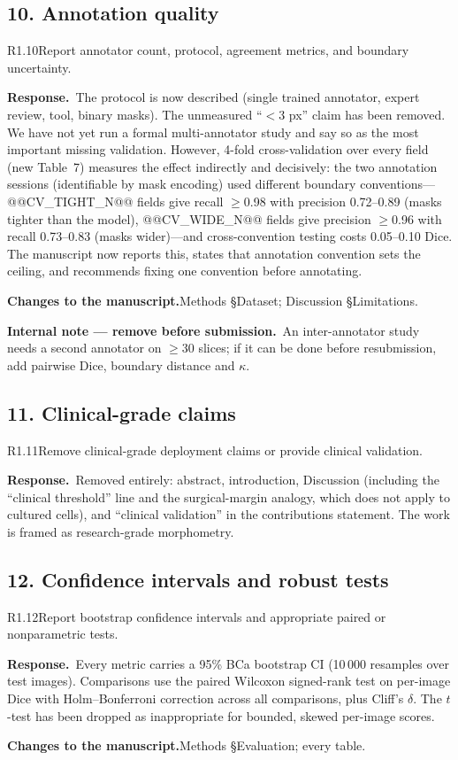 \documentclass[11pt]{article}
\newif\ifinternal \internaltrue
\newcommand{\response}{\par\medskip\noindent\textbf{\color{bblue}Response.}\ }
\newcommand{\actions}{\par\medskip\noindent\textbf{Changes to the manuscript.}}
\newcommand{\internalnote}[1]{\ifinternal\begin{tcolorbox}[breakable,colback=notebg,colframe=notefr,boxrule=0.5pt,arc=2pt]\footnotesize\textbf{Internal note --- remove before submission.}\ #1\end{tcolorbox}\fi}
\begin{document}
\subsection*{10. Annotation quality}
\begin{rcomment}{R1.10}Report annotator count, protocol, agreement metrics, and boundary uncertainty.\end{rcomment}
\response The protocol is now described (single trained annotator, expert review, tool, binary masks). The unmeasured ``$<$3 px'' claim has been removed. We have not yet run a formal multi-annotator study and say so as the most important missing validation. However, 4-fold cross-validation over every field (new Table~7) measures the effect indirectly and decisively: the two annotation sessions (identifiable by mask encoding) used different boundary conventions---@@CV_TIGHT_N@@ fields give recall $\geq$0.98 with precision 0.72--0.89 (masks tighter than the model), @@CV_WIDE_N@@ fields give precision $\geq$0.96 with recall 0.73--0.83 (masks wider)---and cross-convention testing costs 0.05--0.10 Dice. The manuscript now reports this, states that annotation convention sets the ceiling, and recommends fixing one convention before annotating.
\actions Methods §Dataset; Discussion §Limitations. \internalnote{An inter-annotator study needs a second annotator on $\geq$30 slices; if it can be done before resubmission, add pairwise Dice, boundary distance and $\kappa$.}

\subsection*{11. Clinical-grade claims}
\begin{rcomment}{R1.11}Remove clinical-grade deployment claims or provide clinical validation.\end{rcomment}
\response Removed entirely: abstract, introduction, Discussion (including the ``clinical threshold'' line and the surgical-margin analogy, which does not apply to cultured cells), and ``clinical validation'' in the contributions statement. The work is framed as research-grade morphometry.

\subsection*{12. Confidence intervals and robust tests}
\begin{rcomment}{R1.12}Report bootstrap confidence intervals and appropriate paired or nonparametric tests.\end{rcomment}
\response Every metric carries a 95\% BCa bootstrap CI (10\,000 resamples over test images). Comparisons use the paired Wilcoxon signed-rank test on per-image Dice with Holm--Bonferroni correction across all comparisons, plus Cliff's $\delta$. The $t$-test has been dropped as inappropriate for bounded, skewed per-image scores.
\actions Methods §Evaluation; every table.
\end{document}
